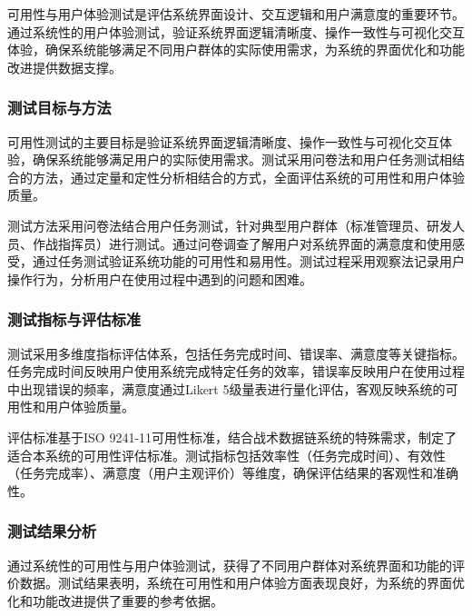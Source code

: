 可用性与用户体验测试是评估系统界面设计、交互逻辑和用户满意度的重要环节。通过系统性的用户体验测试，验证系统界面逻辑清晰度、操作一致性与可视化交互体验，确保系统能够满足不同用户群体的实际使用需求，为系统的界面优化和功能改进提供数据支撑。

\subsubsection{测试目标与方法}

可用性测试的主要目标是验证系统界面逻辑清晰度、操作一致性与可视化交互体验，确保系统能够满足用户的实际使用需求。测试采用问卷法和用户任务测试相结合的方法，通过定量和定性分析相结合的方式，全面评估系统的可用性和用户体验质量。

测试方法采用问卷法结合用户任务测试，针对典型用户群体（标准管理员、研发人员、作战指挥员）进行测试。通过问卷调查了解用户对系统界面的满意度和使用感受，通过任务测试验证系统功能的可用性和易用性。测试过程采用观察法记录用户操作行为，分析用户在使用过程中遇到的问题和困难。

\subsubsection{测试指标与评估标准}

测试采用多维度指标评估体系，包括任务完成时间、错误率、满意度等关键指标。任务完成时间反映用户使用系统完成特定任务的效率，错误率反映用户在使用过程中出现错误的频率，满意度通过Likert 5级量表进行量化评估，客观反映系统的可用性和用户体验质量。

评估标准基于ISO 9241-11可用性标准，结合战术数据链系统的特殊需求，制定了适合本系统的可用性评估标准。测试指标包括效率性（任务完成时间）、有效性（任务完成率）、满意度（用户主观评价）等维度，确保评估结果的客观性和准确性。

\subsubsection{测试结果分析}

通过系统性的可用性与用户体验测试，获得了不同用户群体对系统界面和功能的评价数据。测试结果表明，系统在可用性和用户体验方面表现良好，为系统的界面优化和功能改进提供了重要的参考依据。

